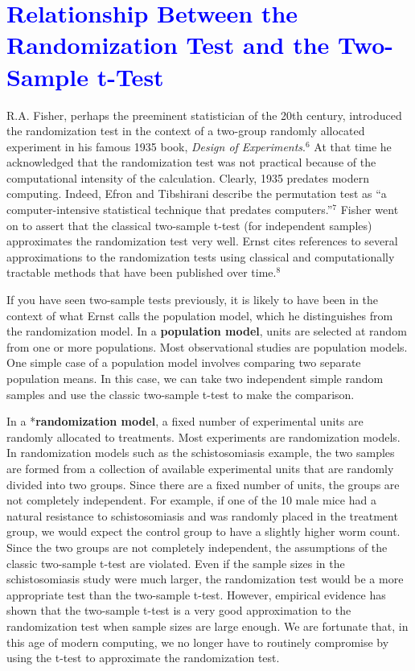 \documentclass[
]{report}
\begin{document}
\hypertarget{section-9}{%
\section{\texorpdfstring{\textcolor{blue}{Relationship Between the Randomization Test and the Two-Sample t-Test}}{}}\label{section-9}}

R.A. Fisher, perhaps the preeminent statistician of the 20th century, introduced the randomization test in the context of a two-group randomly allocated experiment in his famous 1935 book, \emph{Design of Experiments}.\(^6\) At that time he acknowledged that the randomization test was not practical because of the computational
intensity of the calculation. Clearly, 1935 predates modern computing. Indeed, Efron and Tibshirani describe the permutation test as ``a computer-intensive statistical technique that predates computers.''\(^7\) Fisher went on to assert that the classical two-sample t-test (for independent samples) approximates the randomization test very well. Ernst cites references to several approximations to the randomization tests using classical and computationally tractable methods that have been published over time.\(^8\)

If you have seen two-sample tests previously, it is likely to have been in the context of what Ernst calls the population model, which he distinguishes from the randomization model. In a \textbf{population model}, units are selected at random from one or more populations. Most observational studies are population models. One simple case of a population model involves comparing two separate population means. In this case, we can take two independent simple random samples and use the classic two-sample t-test to make the comparison.

In a *\textbf{randomization model}, a fixed number of experimental units are randomly allocated to treatments. Most experiments are randomization models. In randomization models such as the schistosomiasis example, the two samples are formed from a collection of available experimental units that are randomly divided into two groups. Since there are a fixed number of units, the groups are not completely independent. For example, if one of the 10 male mice had a natural resistance to schistosomiasis and was randomly placed in the treatment group, we would expect the control group to have a slightly higher worm count. Since the two groups are not completely independent, the assumptions of the classic two-sample t-test are violated. Even if the sample sizes in the schistosomiasis study were much larger, the randomization test would be a more appropriate test than the two-sample t-test. However, empirical evidence has shown that the two-sample t-test is a very good approximation to the randomization test when sample sizes are large enough. We are fortunate that, in this age of modern computing, we no longer have to routinely compromise by using the t-test to approximate the randomization test.
\end{document}
